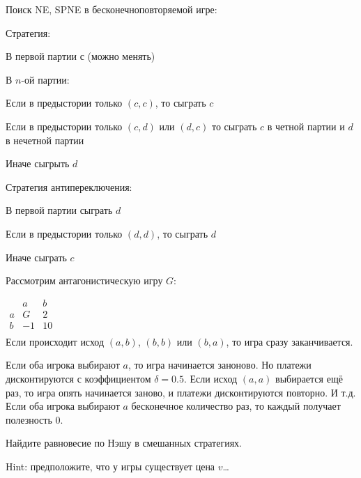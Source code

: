 \begin{problem}
 Поиск NE, SPNE в бесконечноповторяемой игре: \par
Стратегия: \par
В первой партии с (можно менять) \par
В $n$-ой партии:\par
Если в предыстории только $(c,c)$, то сыграть $c$ \par
Если в предыстории только $(c,d)$ или $(d,c)$ то сыграть $c$ в
четной партии и
$d$ в нечетной партии \par
Иначе сыгрыть $d$ \par

Стратегия антипереключения: \par
В первой партии сыграть $d$ \par
Если в предыстории только $(d,d)$, то сыграть $d$ \par
Иначе сыграть $c$



\begin{sol}

\end{sol}
\end{problem}



\begin{problem}
Рассмотрим антагонистическую игру $G$:

$\begin{array}{|c|c|c|}
& a & b \\
a & G & 2 \\
b & -1 & 10 \\
\end{array}$ \\
Если происходит исход $(a,b)$, $(b,b)$ или $(b,a)$, то игра сразу заканчивается. \par
Если оба игрока выбирают $a$, то игра начинается заноново. Но платежи дисконтируются с коэффициентом $\delta=0.5$. Если исход $(a,a)$ выбирается ещё раз, то игра опять начинается заново, и платежи дисконтируются повторно. И т.д. Если оба игрока выбирают $a$ бесконечное количество раз, то каждый получает полезность 0. \par
Найдите равновесие по Нэшу в смешанных стратегиях. \par
Hint: предположите, что у игры существует цена $v$\ldots



\begin{sol}

\end{sol}
\end{problem}





